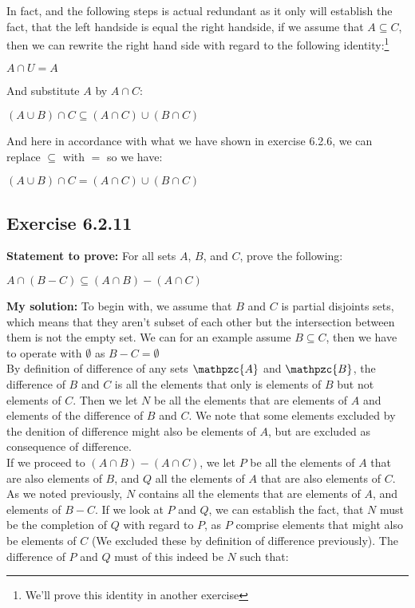 \documentclass{article}
\newcommand{\cent}[1]{\begin{center}#1\end{center}}
\newcommand{\script}[1]{\mathpzc{#1}}
\newcommand{\Prove}{\textbf{Statement to prove: }}
\newcommand{\Solution}{\textbf{My solution: }}
\newcommand{\QED}{\boxed{}}
\newcommand{\Exercise}[1]{\subsection*{Exercise #1}}
\begin{document}
	In fact, and the following steps is actual  redundant as it only will establish the fact, that the left handside is equal the right handside, if we assume that  $A \subseteq C$, then we can rewrite the right hand side with regard to the following identity:\footnote{We'll prove this identity in another exercise}
	
	\cent{$A \cap U = A$}
	
	And substitute $A$ by $A \cap C$:
	
	\cent{$(A \cup B) \cap C \subseteq (A \cap C) \cup (B \cap C)$}
	
	And here in accordance with what we have shown in exercise 6.2.6,  we can replace $\subseteq$ with $=$ so we have:
	\cent{$(A \cup B) \cap C = (A \cap C) \cup (B \cap C)$}
	\QED
	
	\Exercise{6.2.11}
	
	\Prove
	For all sets $A$, $B$, and $C$, prove the following:
	
	\cent{$ A \cap (B-C) \subseteq (A \cap B) - (A \cap C) $}
	
	\Solution
	To begin with, we assume that $B$ and $C$ is partial disjoints sets, which means that they aren't subset of each other but the intersection between them is not the empty set. We can for an example assume $B \subseteq C$, then we have to operate with $\emptyset$ as $B - C = \emptyset$\\
	
	By definition of difference of any sets $\script{A}$ and $ \script{B} $, the difference of $B$ and $C$ is all the elements that only is elements of $B$ but not elements of $C$. Then we let $N$ be all the elements that are elements of $A$ and elements of the difference of $B$ and $C$. We note that some elements excluded by the denition of difference might also be elements of $A$, but are excluded as consequence of difference.\\
	
	If we proceed to $(A \cap B) - (A \cap C)$, we let $P$ be all the elements of $A$ that are also elements of $B$, and $Q$ all the elements of $A$ that are also elements of $C$. As we noted previously, $N$ contains all the elements that are elements of $A$, and elements of $B -C$. If we look at $P$ and $Q$, we can establish the fact, that $N$ must be the completion of $Q$ with regard to $P$, as $P$ comprise elements that might also be elements of $C$ (We excluded these by definition of difference previously). The difference of $P$ and $Q$ must of this indeed be $N$ such that:
	
\end{document}
